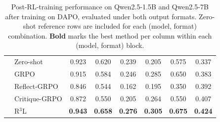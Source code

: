 \begin{table}[t]
{\begin{tabular}{ll cccccc}
 & Zero-shot     & 0.923 & 0.620 & 0.239 & 0.205 & 0.575 & 0.337 \\
 & GRPO          & 0.915 & 0.584 & 0.246 & 0.285 & 0.650 & 0.383 \\
 & Reflect-GRPO  & 0.846 & 0.544 & 0.162 & 0.195 & 0.350 & 0.392 \\
 & Critique-GRPO & 0.872 & 0.550 & 0.205 & 0.264 & 0.550 & 0.407 \\
 & R$^3$L        & \textbf{0.943} & \textbf{0.658} & \textbf{0.276} & \textbf{0.305} & \textbf{0.675} & \textbf{0.424} \\
\bottomrule
\end{tabular}%
}
\caption{Post-RL-training performance on Qwen2.5-1.5B and Qwen2.5-7B after training on DAPO, evaluated under both output formats. Zero-shot reference rows are included for each (model, format) combination. \textbf{Bold} marks the best method per column within each (model, format) block.}
\label{tab:format_posttraining}
\end{table}
